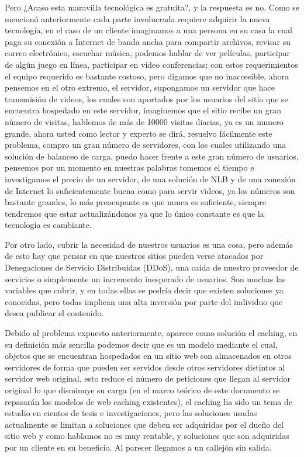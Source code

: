 Pero ¿Acaso esta maravilla tecnológica es gratuita?, y la respuesta es no. Como se mencionó anteriormente cada parte involucrada requiere adquirir la nueva tecnología, en el caso de un cliente imaginamos a una persona en su casa la cual paga su conexión a Internet de banda ancha para compartir archivos, revisar su correo electrónico, escuchar música, podemos hablar de ver películas, participar de algún juego en línea, participar en video conferencias; con estos requerimientos el equipo requerido es bastante costoso, pero digamos que no inaccesible, ahora pensemos en el otro extremo, el servidor, supongamos un servidor que hace transmisión de videos, los cuales son aportados por los usuarios del sitio que se encuentra hospedado en este servidor, imaginemos que el sitio recibe un gran número de visitas, hablemos de más de 10000 visitas diarias, ya es un numero grande, ahora usted como lector y experto se dirá, resuelvo fácilmente este problema, compro un gran número de servidores, con los cuales utilizando una solución de balanceo de carga, puedo hacer frente a este gran número de usuarios, pensemos por un momento en nuestras palabras tomemos el tiempo e investigamos el precio de un servidor, de una solución de NLB y de una conexión de Internet lo suficientemente buena como para servir videos, ya los números son bastante grandes, lo más preocupante es que nunca es suficiente, siempre tendremos que estar actualizándonos ya que lo único constante es que la tecnología es cambiante.

Por otro lado, cubrir la necesidad de nuestros usuarios es una cosa, pero además de esto hay que pensar en que nuestros sitios pueden verse atacados por Denegaciones de Servicio Distribuidas (DDoS), una caída de nuestro proveedor de servicios o simplemente un incremento inesperado de usuarios. Son muchas las variables que cubrir, y en todas ellas se podría decir que existen soluciones ya conocidas, pero todas implican una alta inversión por parte del individuo que desea publicar el contenido. 

Debido al problema expuesto anteriormente, aparece como solución el caching, en su definición más sencilla podemos decir que es un modelo mediante el cual, objetos que se encuentran hospedados en un sitio web son almacenados en otros servidores de forma que pueden ser servidos desde otros servidores distintos al servidor web original, esto reduce el número de peticiones que llegan al servidor original lo que disminuye su carga (en el marco teórico de este documento se repasarán los modelos de web caching existentes), el caching ha sido un tema de estudio en cientos de tesis e investigaciones, pero las soluciones usadas actualmente se limitan a soluciones que deben ser adquiridas por el dueño del sitio web y como hablamos no es muy rentable, y soluciones que son adquiridas por un cliente en su beneficio. Al parecer llegamos a un callejón sin salida.

